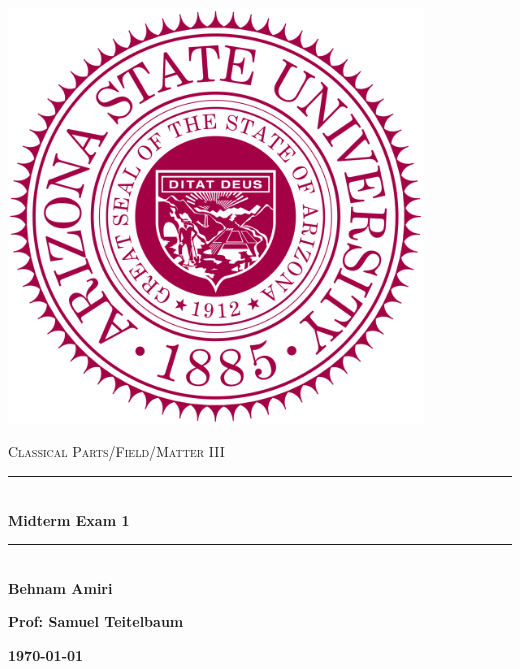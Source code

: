 \documentclass[fleqn]{article}
\begin{document}
  \begin{titlepage}

    \newcommand{\HRule}{\rule{\linewidth}{0.5mm}}

    \center

    \begin{center}
      \includegraphics[height=11cm, width=11cm]{asu.png}
    \end{center}

    \vline

    \textsc{\LARGE Classical Parts/Field/Matter III}\\[1.5cm]

    \HRule \\[0.5cm]
    { \huge \bfseries Midterm Exam 1}\\[0.4cm] 
    \HRule \\[1.0cm]

    \textbf{Behnam Amiri}

    \bigbreak

    \textbf{Prof: Samuel Teitelbaum}

    \bigbreak

    \textbf{{\large \today}\\[2cm]}

    \vfill

  \end{titlepage}
\end{document}
